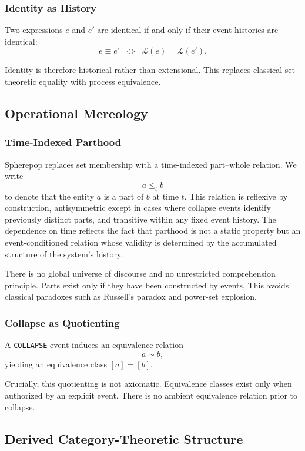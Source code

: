 \documentclass[11pt]{article}
\begin{document}
\subsubsection{Identity as History}

Two expressions $e$ and $e'$ are identical if and only if their event histories are identical:
\[
e \equiv e' \;\;\Longleftrightarrow\;\; \mathcal{L}(e) = \mathcal{L}(e').
\]

Identity is therefore historical rather than extensional. This replaces classical set-theoretic equality with process equivalence.

\subsection{Operational Mereology}

\subsubsection{Time-Indexed Parthood}

Spherepop replaces set membership with a time-indexed part--whole relation. We write
\[
a \le_t b
\]
to denote that the entity $a$ is a part of $b$ at time $t$. This relation is reflexive by construction, antisymmetric except in cases where collapse events identify previously distinct parts, and transitive within any fixed event history. The dependence on time reflects the fact that parthood is not a static property but an event-conditioned relation whose validity is determined by the accumulated structure of the system’s history.


There is no global universe of discourse and no unrestricted comprehension principle. Parts exist only if they have been constructed by events. This avoids classical paradoxes such as Russell’s paradox and power-set explosion.

\subsubsection{Collapse as Quotienting}

A \texttt{COLLAPSE} event induces an equivalence relation
\[
a \sim b,
\]
yielding an equivalence class $[a] = [b]$.

Crucially, this quotienting is not axiomatic. Equivalence classes exist only when authorized by an explicit event. There is no ambient equivalence relation prior to collapse.

\subsection{Derived Category-Theoretic Structure}
\end{document}
